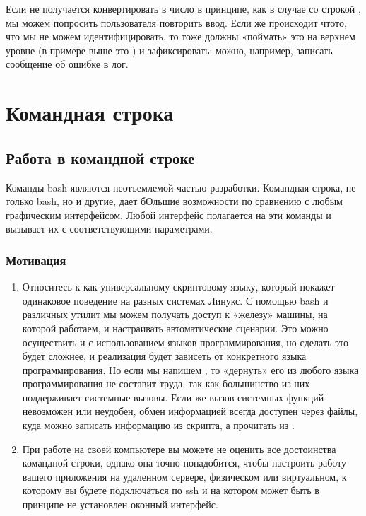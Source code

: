 \documentclass[letterpaper,10pt,russian]{sphinxmanual}
\begin{document}
\sphinxAtStartPar
Если не получается конвертировать в число в принципе, как в случае со строкой , мы можем попросить пользователя повторить ввод. Если же происходит что\sphinxhyphen{}то, что мы не можем идентифицировать, то тоже должны «поймать» это на верхнем уровне (в примере выше это ) и зафиксировать: можно, например, записать сообщение об ошибке в лог.


\chapter{Командная строка}
\label{\detokenize{index:id3}}
\sphinxstepscope


\section{Работа в командной строке}
\label{\detokenize{educational_materials/bash/content:id1}}\label{\detokenize{educational_materials/bash/content::doc}}
\sphinxAtStartPar
Команды bash являются неотъемлемой частью разработки. Командная строка, не только bash, но и другие, дает бОльшие возможности по сравнению с любым графическим интерфейсом. Любой интерфейс полагается на эти команды и вызывает их с соответствующими параметрами.


\subsection{Мотивация}
\label{\detokenize{educational_materials/bash/content:id2}}\begin{enumerate}
%
\item {} 
\sphinxAtStartPar
Относитесь к  как универсальному скриптовому языку, который покажет одинаковое поведение на разных системах Линукс. С помощью bash и различных утилит мы можем получать доступ к «железу» машины, на которой работаем, и настраивать автоматические сценарии. Это можно осуществить и с использованием языков программирования, но сделать это будет сложнее, и реализация будет зависеть от конкретного языка программирования. Но если мы напишем , то «дернуть» его из любого языка программирования не составит труда, так как большинство из них поддерживает системные вызовы. Если же вызов системных функций невозможен или неудобен, обмен информацией всегда доступен через файлы, куда можно записать информацию из \sphinxhyphen{}скрипта, а прочитать из .

\item {} 
\sphinxAtStartPar
При работе на своей компьютере вы можете не оценить все достоинства командной строки, однако она точно понадобится, чтобы настроить работу вашего приложения на удаленном сервере, физическом или виртуальном, к которому вы будете подключаться по ssh и на котором может быть в принципе не установлен оконный интерфейс.

\end{enumerate}
\end{document}
